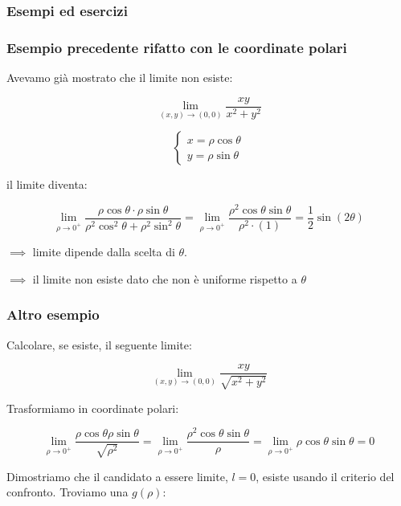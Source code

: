 \pagebreak

\subsubsection{Esempi ed esercizi}

\subsubsection*{Esempio precedente rifatto con le coordinate polari}

Avevamo già mostrato che il limite non esiste:

\[
    \lim_{ (x,y) \to (0,0) } \frac{xy}{x^{2}+y^{2}}
\]

\begin{equation*}
    \begin{cases}
        x = \rho\cos\theta \\
        y = \rho\sin\theta
    \end{cases}
\end{equation*}

il limite diventa:

\[
    \lim_{ \rho \to 0^{+} } \frac{\rho\cos\theta \cdot\rho\sin\theta }{\rho^{2}\cos^{2}\theta  + \rho^{2}\sin^{2}\theta } = \lim_{ \rho \to 0^{+} } \frac{\rho^{2}\cos\theta \sin\theta }{\rho^{2} \cdot (1)} = \frac{1}{2}\sin(2\theta)
\]

\(\implies \) limite dipende dalla scelta di \(\theta \).

\(\implies \) il limite non esiste dato che non è uniforme rispetto a \(\theta \)

\filbreak{}
\subsubsection*{Altro esempio}

Calcolare, se esiste, il seguente limite:

\[
    \lim_{ (x,y) \to (0,0) } \frac{xy}{\sqrt{x^{2}+y^{2}}}
\]

Trasformiamo in coordinate polari:

\[
    \lim_{ \rho \to 0^{+} } \frac{\rho\cos\theta  \rho\sin\theta }{\sqrt{\rho^{2}}} = \lim_{ \rho \to 0^{+} } \frac{\rho^{2}\cos\theta \sin\theta }{\rho} = \lim_{ \rho \to 0^{+} } \rho\cos\theta\sin\theta = 0
\]

Dimostriamo che il candidato a essere limite, \(l=0\), esiste usando il criterio del confronto. Troviamo una \(g(\rho)\):

